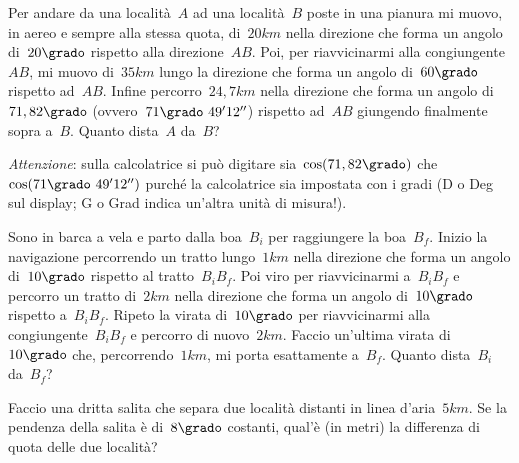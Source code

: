 \begin{multicols}{2}
\begin{esercizio}[\Ast]
\label{ese:G.43}
Per andare da una località~$A$ ad una località~$B$ poste in una pianura mi muovo, in aereo e sempre alla stessa quota, di~$20\unit{km}$
nella direzione che forma un angolo di~$20\grado$ rispetto alla direzione~$AB$. Poi, per riavvicinarmi alla congiungente~$AB$,
mi muovo di~$35\unit{km}$ lungo la direzione che forma un angolo di~$60\grado$ rispetto ad~$AB$. Infine percorro~$24,7\unit{km}$
nella direzione che forma un angolo di~$71,82\grado$ (ovvero~$71\grado~49' 12''$) rispetto ad~$AB$ giungendo finalmente sopra a~$B$.
Quanto dista~$A$ da~$B$?

\emph{Attenzione}: sulla calcolatrice si può digitare sia~$\cos(71,82\grado)$ che~$\cos(71\grado~49' 12'')$ purché la calcolatrice sia
impostata con i gradi (D o Deg sul display; G o Grad indica un'altra unità di misura!).

\begin{center}
 
\end{center}
\end{esercizio}
\end{multicols}
\begin{esercizio}[\Ast]
\label{ese:G.44}
Sono in barca a vela e parto dalla boa~$B_i$ per raggiungere la boa~$B_f$. Inizio la navigazione percorrendo un tratto lungo~$1\unit{km}$
nella direzione che forma un angolo di~$10\grado$ rispetto al tratto~$B_i B_f$. Poi viro per riavvicinarmi a~$B_i B_f$ e percorro un tratto
di~$2\unit{km}$ nella direzione che forma un angolo di~$10\grado$ rispetto a~$B_i B_f$. Ripeto la virata di~$10\grado$ per
riavvicinarmi alla congiungente~$B_i B_f$ e percorro di nuovo~$2\unit{km}$. Faccio un'ultima virata di~$10\grado$ che, percorrendo~$1\unit{km}$,
mi porta esattamente a~$B_f$. Quanto dista~$B_i$ da~$B_f$?
\pagebreak
\begin{center}
 
\end{center}
\end{esercizio}

\begin{esercizio}[\Ast]
\label{ese:G.45}
Faccio una dritta salita che separa due località distanti in linea d'aria~$5\unit{km}$. Se la pendenza della salita è di~$8\grado$ costanti,
qual'è (in metri) la differenza di quota delle due località?
\end{esercizio}

